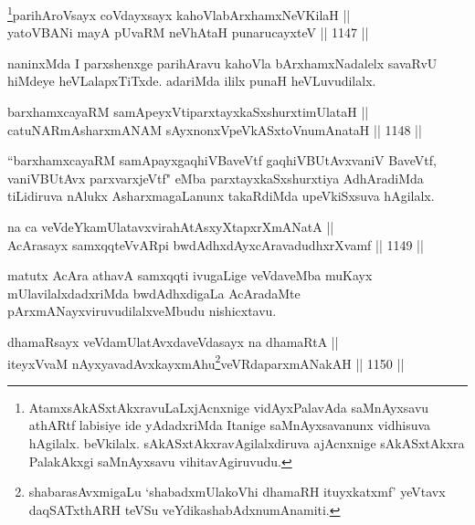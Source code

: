 
\begin{shl}
\footnote{AtamxsAkASxtAkxravuLaLxjAcnxnige vidAyxPalavAda saMnAyxsavu athARtf labisiye ide yAdadxriMda Itanige saMnAyxsavanunx vidhisuva hAgilalx. beVkilalx. sAkASxtAkxravAgilalxdiruva ajAcnxnige sAkASxtAkxra PalakAkxgi saMnAyxsavu vihitavAgiruvudu.}parihAroV\s sayx coVdayxsayx kahoVlabArxhamxNeV\s KilaH || \\
yatoV\s BANi mayA pUvaRM neVhAtaH punarucayxteV \hfill || 1147 ||  
\end{shl}

\begin{artha}
naninxMda I parxshenxge parihAravu kahoVla bArxhamxNadalelx savaRvU hiMdeye heVLalapxTiTxde. adariMda ililx punaH heVLuvudilalx.
\end{artha}


\begin{shl}
barxhamxcayaRM samApeyxVtiparxtayxkaSxshurxtimUlataH || \\
catuNARmAsharxmANAM sAyxnonxVpeVkASx\s toV\s numAnataH \hfill || 1148 ||  
\end{shl}

\begin{artha}
``barxhamxcayaRM samApayxgaqhiVBaveVtf gaqhiVBUtAvxvaniV BaveVtf, vaniVBUtAvx parxvarxjeVtf" eMba parxtayxkaSxshurxtiya AdhAradiMda tiLidiruva nAlukx AsharxmagaLanunx takaRdiMda upeVkiSxsuva hAgilalx.
\end{artha}

\begin{shl}
na ca veVdeYkamUlatavxvirahAtAsxyXtapxrXmANatA || \\
AcArasayx samxqqteVvAR\s pi bwdAdhxdAyxcAravadudhxrXvamf \hfill || 1149 ||  
\end{shl}

\begin{artha}
matutx AcAra athavA samxqqti ivugaLige veVdaveMba muKayx mUlavilalxdadxriMda bwdAdhxdigaLa AcAradaMte pArxmANayxviruvudilalxveMbudu nishicxtavu.
\end{artha}


\begin{shl}
dhamaRsayx veVdamUlatAvxdaveVdasayx na dhamaRtA ||  \\
iteyxVvaM nAyxyavadAvxkayxmAhu\footnote{shabarasAvxmigaLu `shabadxmUlakoVhi dhamaRH ituyxkatxmf' yeVtavx daqSATxthARH teVSu  veYdikashabAdxnumAnamiti.}veVRdaparxmANakAH \hfill || 1150 ||  
\end{shl}



